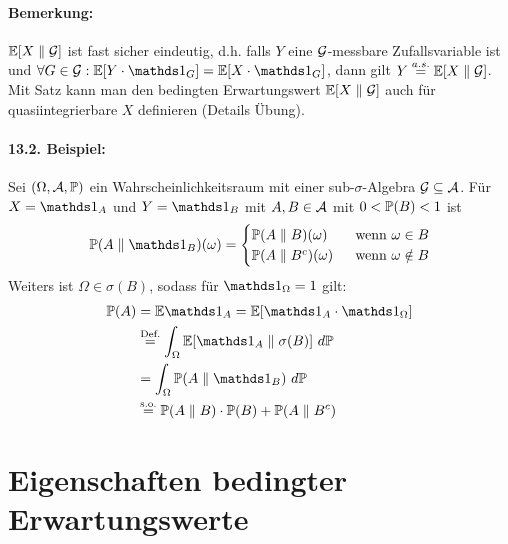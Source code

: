 \documentclass[11pt]{report}
\begin{document}
     \paragraph{Bemerkung:}$\mathbb{E}[X\parallel\mathcal{G}]$ ist fast sicher eindeutig, d.h. falls $Y$ eine $\mathcal{G}$-messbare Zufallsvariable ist und $\forall G\in\G:\E[Y\cdot\ind{G}]=\E[X\cdot\ind{G}]$, dann gilt $Y\overset{a.s.}{=}\mathbb{E}[X\parallel\mathcal{G}]$. Mit Satz kann man den bedingten Erwartungswert $\mathbb{E}[X\parallel\mathcal{G}]$ auch f\"ur quasiintegrierbare $X$ definieren (Details \"Ubung).
     
     \paragraph{13.2. Beispiel:}Sei $(\Omega, \mathcal{A}, \mathbb{P})$ ein Wahrscheinlichkeitsraum mit einer sub-$\sigma$-Algebra $\mathcal{G}\subseteq\mathcal{A}$. F\"ur $X=\ind{A}$ und $Y=\ind{B}$ mit $A,B\in\mathcal{A}$ mit $0<\mathbb{P}(B)<1$ ist
     \begin{align*}
         \Pp(A\parallel \ind{B})(\omega)=
         \begin{cases}
             \Pp(A\parallel B)(\omega)\ \ &\text{ wenn }\omega\in B \\
             \Pp(A\parallel B^c)(\omega)&\text{ wenn }\omega\notin B
         \end{cases}
     \end{align*}
     Weiters ist $\Omega\in\sigma(B)$, sodass f\"ur $\ind{\Omega}=1$ gilt:
     \begin{align*}
         \Pp(A)&=\E\ind{A}=\E[\ind{A}\cdot\ind{\Omega}]\\
         &\overset{\text{Def.}}{=}\int_\Omega\E[\ind{A}\parallel\sigma(B)]\ d\Pp\\
         &=\int_\Omega\Pp(A\parallel\ind{B})\ d\Pp \\
         &\overset{\text{s.o.}}{=}\Pp(A\parallel B)\cdot\Pp(B)+\Pp(A\parallel B^c)
     \end{align*}
     
     \section*{Eigenschaften bedingter Erwartungswerte}
\end{document}

